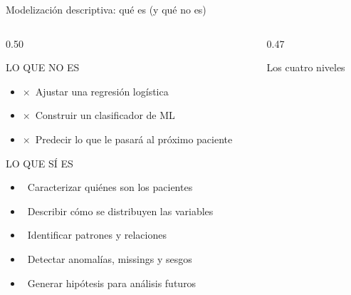 \documentclass[aspectratio=169,10pt]{beamer}
\newcommand{\yes}{\textcolor{UCgreen!70!black}{\checkmark}}
\newcommand{\no}{\textcolor{UCred}{$\boldsymbol{\times}$}}
\begin{document}
\begin{frame}{Modelización descriptiva: qué es (y qué no es)}
  \begin{columns}[T]
    \begin{column}{0.50\textwidth}
      \begin{block}{LO QUE NO ES}
        \begin{itemize}\small
          \item \no\ Ajustar una regresión logística
          \item \no\ Construir un clasificador de ML
          \item \no\ Predecir lo que le pasará al próximo paciente
        \end{itemize}
      \end{block}
      \vspace{3mm}
      \begin{exampleblock}{LO QUE SÍ ES}
        \begin{itemize}\small
          \item \yes\ Caracterizar quiénes son los pacientes
          \item \yes\ Describir cómo se distribuyen las variables
          \item \yes\ Identificar patrones y relaciones
          \item \yes\ Detectar anomalías, missings y sesgos
          \item \yes\ Generar hipótesis para análisis futuros
        \end{itemize}
      \end{exampleblock}
    \end{column}
    \begin{column}{0.47\textwidth}
      \vspace{3mm}
      \begin{block}{Los cuatro niveles}
        \centering\vspace{2mm}
\end{block}
\end{column}
\end{columns}
\end{frame}
\end{document}
